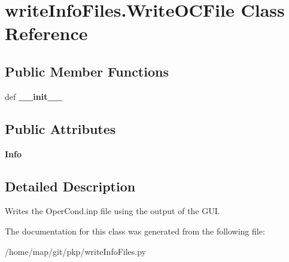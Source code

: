 \hypertarget{classwriteInfoFiles_1_1WriteOCFile}{\section{write\-Info\-Files.\-Write\-O\-C\-File \-Class \-Reference}
\label{classwriteInfoFiles_1_1WriteOCFile}
}
\subsection*{\-Public \-Member \-Functions}
\begin{DoxyCompactItemize}
\item 
\hypertarget{classwriteInfoFiles_1_1WriteOCFile_a5729bc63ac8bb392f5a281b2d6686f0a}{def {\bfseries \-\_\-\-\_\-init\-\_\-\-\_\-}}\label{classwriteInfoFiles_1_1WriteOCFile_a5729bc63ac8bb392f5a281b2d6686f0a}

\end{DoxyCompactItemize}
\subsection*{\-Public \-Attributes}
\begin{DoxyCompactItemize}
\item 
\hypertarget{classwriteInfoFiles_1_1WriteOCFile_aa8b3905f0a69bd5560bd7bccad0bd689}{{\bfseries \-Info}}\label{classwriteInfoFiles_1_1WriteOCFile_aa8b3905f0a69bd5560bd7bccad0bd689}

\end{DoxyCompactItemize}


\subsection{\-Detailed \-Description}
\begin{DoxyVerb}Writes the OperCond.inp file using the output of the GUI.\end{DoxyVerb}
 

\-The documentation for this class was generated from the following file\-:\begin{DoxyCompactItemize}
\item 
/home/map/git/pkp/write\-Info\-Files.\-py\end{DoxyCompactItemize}
